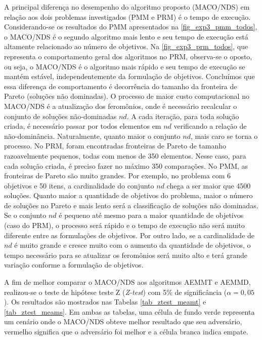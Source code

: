 A principal diferença no desempenho do algoritmo proposto (MACO/NDS) em relação aos dois problemas investigados (PMM e PRM) é o tempo de execução. Considerando-se os resultados do PMM apresentados na \autoref{fig_exp3_pmm_todos}, o MACO/NDS é o segundo algoritmo mais lento e seu tempo de execução está altamente relacionado ao número de objetivos. Na \autoref{fig_exp3_prm_todos}, que representa o comportamento geral dos algoritmos no PRM, observa-se o oposto, ou seja, o MACO/NDS é o algoritmo mais rápido e seu tempo de execução se mantém estável, independentemente da formulação de objetivos. Concluímos que essa diferença de comportamento é decorrência do tamanho da fronteira de Pareto (soluções não dominadas). O processo de maior custo computacional no MACO/NDS é a atualização dos feromônios, onde é necessário recalcular o conjunto de soluções não-dominadas $nd$. A cada iteração, para toda solução criada, é necessário passar por todos elementos em $nd$ verificando a relação de não-dominância. Naturalmente, quanto maior o conjunto $nd$, mais caro se torna o processo. No PRM, foram encontradas fronteiras de Pareto de tamanho razoavelmente pequenos, todas com menos de 350 elementos. Nesse caso, para cada solução criada, é preciso fazer no máximo 350 comparações. No PMM, as fronteiras de Pareto são muito grandes. Por exemplo, no problema com 6 objetivos e 50 itens, a cardinalidade do conjunto $nd$ chega a ser maior que 4500 soluções. Quanto maior a quantidade de objetivos do problema, maior o número de soluções no Pareto e mais lento será a classificação de soluções não dominadas. Se o conjunto $nd$ é pequeno até mesmo para a maior quantidade de objetivos (caso do PRM), o processo será rápido e o tempo de execução não será muito diferente entre as formulações de objetivos. Por outro lado, se a cardinalidade de $nd$ é muito grande e cresce muito com o aumento da quantidade de objetivos, o tempo necessário para se atualizar os feromônios será muito alto e terá grande variação conforme a formulação de objetivos.

A fim de melhor comparar o MACO/NDS aos algoritmos AEMMT e AEMMD, realizou-se o teste de hipótese teste Z (\textit{Z-test}) com 5\% de significância ($\alpha=0,05$). Os resultados são mostrados nas Tabelas \ref{tab_ztest_meamt} e \ref{tab_ztest_meams}. Em ambas as tabelas, uma célula de fundo verde representa um cenário onde o MACO/NDS obteve melhor resultado que seu adversário, vermelho significa que o adversário foi melhor e a célula branca indica empate.

